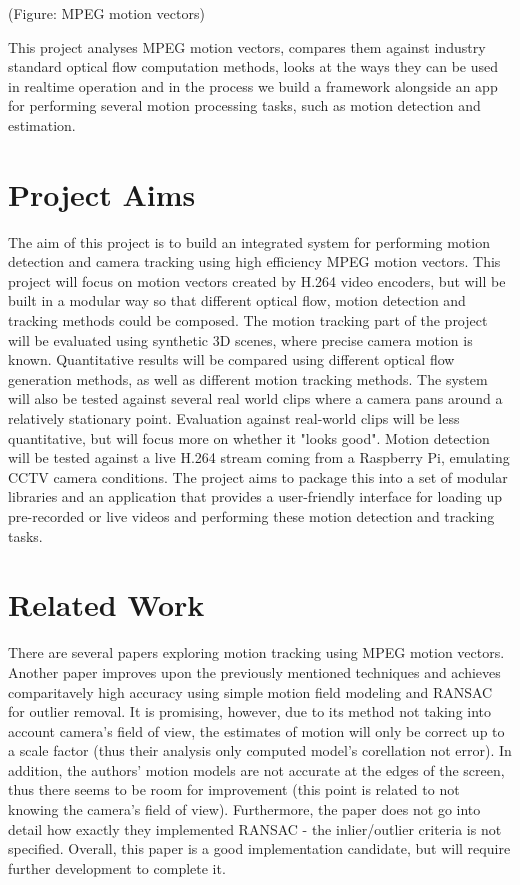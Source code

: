 \documentclass[11pt,english]{report}
\begin{document}
(Figure: MPEG motion vectors)

This project analyses MPEG motion vectors, compares them against industry standard optical flow computation methods, looks at the ways they can be used in realtime operation and in the process we build a framework alongside an app for performing several motion processing tasks, such as motion detection and estimation.

\section{Project Aims}

The aim of this project is to build an integrated system for performing motion detection and camera tracking using high efficiency MPEG motion vectors. This project will focus on motion vectors created by H.264 video encoders, but will be built in a modular way so that different optical flow, motion detection and tracking methods could be composed. The motion tracking part of the project will be evaluated using synthetic 3D scenes, where precise camera motion is known. Quantitative results will be compared using different optical flow generation methods, as well as different motion tracking methods. The system will also be tested against several real world clips where a camera pans around a relatively stationary point. Evaluation against real-world clips will be less quantitative, but will focus more on whether it "looks good". Motion detection will be tested against a live H.264 stream coming from a Raspberry Pi, emulating CCTV camera conditions. The project aims to package this into a set of modular libraries and an application that provides a user-friendly interface for loading up pre-recorded or live videos and performing these motion detection and tracking tasks.

\section{Related Work}

There are several papers exploring motion tracking using MPEG motion vectors\cite{1334181}\cite{1414440}\cite{825867}. Another paper improves upon the previously mentioned techniques and achieves comparitavely high accuracy using simple motion field modeling and RANSAC for outlier removal\cite{almeida}. It is promising, however, due to its method not taking into account camera's field of view, the estimates of motion will only be correct up to a scale factor (thus their analysis only computed model's corellation not error). In addition, the authors' motion models are not accurate at the edges of the screen, thus there seems to be room for improvement (this point is related to not knowing the camera's field of view). Furthermore, the paper does not go into detail how exactly they implemented RANSAC - the inlier/outlier criteria is not specified. Overall, this paper is a good implementation candidate, but will require further development to complete it.
\end{document}

